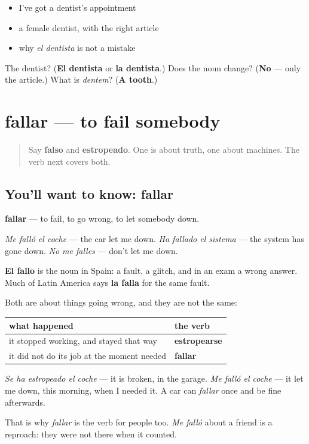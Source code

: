\begin{itemize}
\raggedright
  \item I've got a dentist's appointment
  \item a female dentist, with the right article
  \item why \emph{el dentista} is not a mistake
\end{itemize}

\begin{tcolorbox}[breakable,colback=teal!4,colframe=teal!35!black,title={Before you move on}]
The dentist? (\textbf{El dentista} or \textbf{la dentista}.) Does the noun change? (\textbf{No} — only the article.) What is \emph{dentem}? (\textbf{A tooth}.)
\end{tcolorbox}
\section[fallar]{fallar — to fail somebody}

\label{lesson:ES-C464-fallar}



\begin{quote}
Say \textbf{falso} and \textbf{estropeado}. One is about truth, one about machines. The verb next covers both.
\end{quote}

\subsection*{You'll want to know: fallar}
\textbf{fallar} — to fail, to go wrong, to let somebody down.

\emph{Me falló el coche} — the car let me down. \emph{Ha fallado el sistema} — the system has gone down. \emph{No me falles} — don't let me down.

\textbf{El fallo} is the noun in Spain: a fault, a glitch, and in an exam a wrong answer. Much of Latin America says \textbf{la falla} for the same fault.

\begin{grammarlens}[title={Grammar Lens: fallar is not estropearse}]
Both are about things going wrong, and they are not the same:

\noindent
\begin{tabularx}{\linewidth}{@{}>{\raggedright\arraybackslash}X>{\raggedright\arraybackslash}X@{}}
\toprule
\textbf{what happened} & \textbf{the verb} \\
\midrule
it stopped working, and stayed that way & \textbf{estropearse} \\
it did not do its job at the moment needed & \textbf{fallar} \\
\bottomrule
\end{tabularx}

\emph{Se ha estropeado el coche} — it is broken, in the garage. \emph{Me falló el coche} — it let me down, this morning, when I needed it. A car can \emph{fallar} once and be fine afterwards.

That is why \emph{fallar} is the verb for people too. \emph{Me falló} about a friend is a reproach: they were not there when it counted.
\end{grammarlens}

